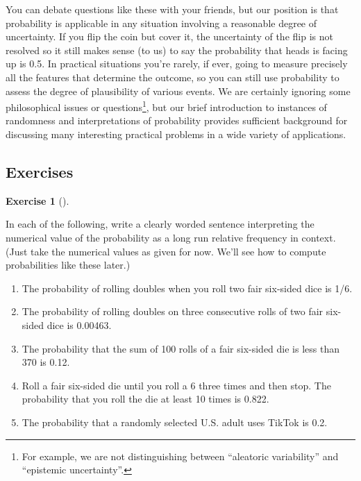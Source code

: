 \documentclass[
  letterpaper,
  DIV=11,
  numbers=noendperiod]{scrreprt}
\providecommand{\tightlist}{%
  \setlength{\itemsep}{0pt}\setlength{\parskip}{0pt}}
\theoremstyle{plain}
\theoremstyle{definition}
\theoremstyle{definition}
\newtheorem{exercise}{Exercise}[chapter]
\theoremstyle{definition}
\theoremstyle{remark}
\begin{document}
You can debate questions like these with your friends, but our position
is that probability is applicable in any situation involving a
reasonable degree of uncertainty. If you flip the coin but cover it, the
uncertainty of the flip is not resolved so it still makes sense (to us)
to say the probability that heads is facing up is 0.5. In practical
situations you're rarely, if ever, going to measure precisely all the
features that determine the outcome, so you can still use probability to
assess the degree of plausibility of various events. We are certainly
ignoring some philosophical issues or questions\footnote{For example, we
  are not distinguishing between ``aleatoric variability'' and
  ``epistemic uncertainty''.}, but our brief introduction to instances
of randomness and interpretations of probability provides sufficient
background for discussing many interesting practical problems in a wide
variety of applications.

\subsection{Exercises}\label{exercises-1}

\begin{exercise}[]\protect\hypertarget{exr-interpret-rel-freq}{}\label{exr-interpret-rel-freq}

In each of the following, write a clearly worded sentence interpreting
the numerical value of the probability as a long run relative frequency
in context. (Just take the numerical values as given for now. We'll see
how to compute probabilities like these later.)

\begin{enumerate}
\def\labelenumi{\arabic{enumi}.}
\tightlist
\item
  The probability of rolling doubles when you roll two fair six-sided
  dice is 1/6.
\item
  The probability of rolling doubles on three consecutive rolls of two
  fair six-sided dice is 0.00463.
\item
  The probability that the sum of 100 rolls of a fair six-sided die is
  less than 370 is 0.12.
\item
  Roll a fair six-sided die until you roll a 6 three times and then
  stop. The probability that you roll the die at least 10 times is
  0.822.
\item
  The probability that a randomly selected U.S. adult uses TikTok is
  0.2.
\end{enumerate}

\end{exercise}
\end{document}
